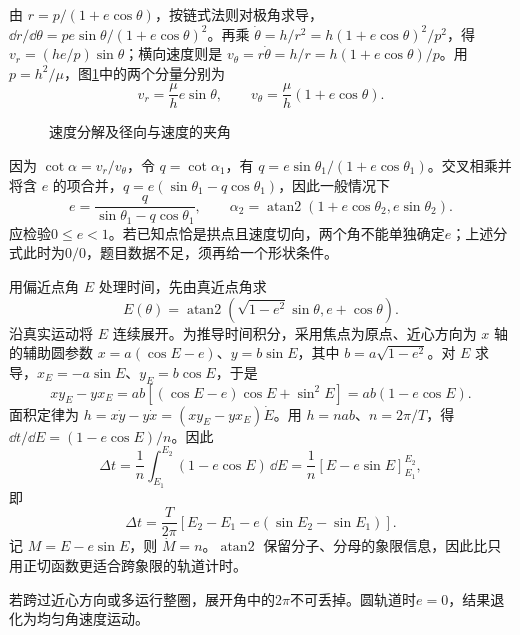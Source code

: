 \begin{solution}
由 $r=p/(1+e\cos\theta)$，按链式法则对极角求导，$\dd r/\dd\theta=pe\sin\theta/(1+e\cos\theta)^2$。再乘 $\dot\theta=h/r^2=h(1+e\cos\theta)^2/p^2$，得 $v_r=(he/p)\sin\theta$；横向速度则是 $v_\theta=r\dot\theta=h/r=h(1+e\cos\theta)/p$。用 $p=h^2/\mu$，图\ref{fig:hw8-1-s}中的两个分量分别为
\[
 v_r=\frac{\mu}{h}e\sin\theta,\qquad
 v_\theta=\frac{\mu}{h}(1+e\cos\theta).
\]

\begin{figure}[H]\centering
{}
\caption{速度分解及径向与速度的夹角}\label{fig:hw8-1-s}
\end{figure}

因为 $\cot\alpha=v_r/v_\theta$，令 $q=\cot\alpha_1$，有 $q=e\sin\theta_1/(1+e\cos\theta_1)$。交叉相乘并将含 $e$ 的项合并，$q=e(\sin\theta_1-q\cos\theta_1)$，因此一般情况下
\[
 \boxed{e=\frac{q}{\sin\theta_1-q\cos\theta_1}},\qquad
 \boxed{\alpha_2=\operatorname{atan2}(1+e\cos\theta_2,e\sin\theta_2)}.
\]
应检验$0\le e<1$。若已知点恰是拱点且速度切向，两个角不能单独确定$e$；上述分式此时为$0/0$，题目数据不足，须再给一个形状条件。

用偏近点角 $E$ 处理时间，先由真近点角求
\[
E(\theta)=\operatorname{atan2}(\sqrt{1-e^2}\sin\theta,e+\cos\theta).
\]
沿真实运动将 $E$ 连续展开。为推导时间积分，采用焦点为原点、近心方向为 $x$ 轴的辅助圆参数 $x=a(\cos E-e)$、$y=b\sin E$，其中 $b=a\sqrt{1-e^2}$。对 $E$ 求导，$x_E=-a\sin E$、$y_E=b\cos E$，于是
\[
xy_E-yx_E=ab[(\cos E-e)\cos E+\sin^2E]=ab(1-e\cos E).
\]
面积定律为 $h=x\dot y-y\dot x=(xy_E-yx_E)\dot E$。用 $h=nab$、$n=2\pi/T$，得 $\dd t/\dd E=(1-e\cos E)/n$。因此
\[
\Delta t=\frac1n\int_{E_1}^{E_2}(1-e\cos E)\,\dd E
=\frac1n[E-e\sin E]_{E_1}^{E_2},
\]
即
\[
\boxed{\Delta t=\frac{T}{2\pi}[E_2-E_1-e(\sin E_2-\sin E_1)]}.
\]
记 $M=E-e\sin E$，则 $\dot M=n$。$\operatorname{atan2}$ 保留分子、分母的象限信息，因此比只用正切函数更适合跨象限的轨道计时。

若跨过近心方向或多运行整圈，展开角中的$2\pi$不可丢掉。圆轨道时$e=0$，结果退化为均匀角速度运动。


\end{solution}



